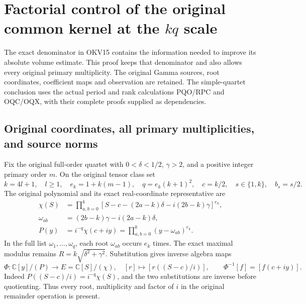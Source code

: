 \documentclass[11pt,a4paper]{article}
\begin{document}
\section{Factorial control of the original common kernel at the $kq$ scale}
\label{sec:KAF}

The exact denominator in OKV15 contains the information needed to improve
its absolute volume estimate. This proof keeps that denominator and also
allows every original primary multiplicity. The original Gamma sources,
root coordinates, coefficient maps and observation are retained. The
simple-quartet conclusion uses the actual period and rank calculations
PQO/RPC and OQC/OQX, with their complete proofs supplied as dependencies.

\subsection{Original coordinates, all primary multiplicities, and source norms}
Fix the original full-order quartet with $0<\delta<1/2$, $\gamma>2$,
and a positive integer primary order $m$. On the original tensor class set
\[
 k=4l+1,\quad l\ge1,\quad e_k=1+k(m-1),\quad
 q=e_k(k+1)^2,\quad c=k/2,\quad s\in\{1,k\},\quad b_s=s/2.
 \tag{KAF1}
\]
The original polynomial and its exact real-coordinate representative are
\[
\begin{split}
 \chi(S)&=\prod_{a,b=0}^k
 [S-c-(2a-k)\delta-i(2b-k)\gamma]^{e_k},\\
 \omega_{ab}&=(2b-k)\gamma-i(2a-k)\delta,\\
 P(y)&=i^{-q}\chi(c+iy)
       =\prod_{a,b=0}^k(y-\omega_{ab})^{e_k}.
\end{split}\tag{KAF2}
\]
In the full list $\omega_1,\ldots,\omega_q$, each root $\omega_{ab}$
occurs $e_k$ times. The exact maximal modulus remains
$R=k\sqrt{\delta^2+\gamma^2}$. Substitution gives inverse algebra maps
\[
 \Phi:\mathbb C[y]/(P)\longrightarrow E=\mathbb C[S]/(\chi),
 \quad[r]\longmapsto[r((S-c)/i)],\qquad
 \Phi^{-1}[f]=[f(c+iy)].\tag{KAF3}
\]
Indeed $P((S-c)/i)=i^{-q}\chi(S)$, and the two substitutions are
inverse before quotienting. Thus every root, multiplicity and factor of
$i$ in the original remainder operation is present.
\end{document}
